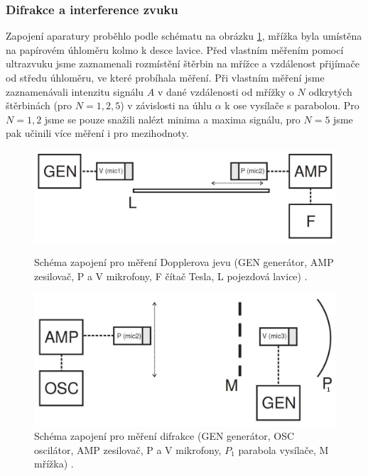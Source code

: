\documentclass[english]{article}
\begin{document}
	\subsubsection{Difrakce a interference zvuku}
		Zapojení aparatury proběhlo podle schématu na obrázku \ref{fig:s_difrakce}, mřížka byla umístěna na papírovém úhloměru kolmo k desce lavice. Před vlastním měřením pomocí ultrazvuku jsme zaznamenali rozmístění štěrbin na mřížce a vzdálenost přijímače od středu úhloměru, ve které probíhala měření. Při vlastním měření jsme zaznamenávali intenzitu signálu $A$ v dané vzdálenosti od mřížky o $N$ odkrytých štěrbinách (pro $N = 1,2,5$) v závislosti na úhlu $\alpha$ k ose vysílače s parabolou. Pro $N=1, 2$ jsme se pouze snažili nalézt minima a maxima signálu, pro $N=5$ jsme pak učinili více měření i pro mezihodnoty.
		
	\begin{figure}
	\begin{minipage}{.45\textwidth}
		\centering
		\includegraphics[width=1\linewidth]{att/s_doppler.jpg}
		\caption{Schéma zapojení pro měření Dopplerova jevu (GEN generátor, AMP zesilovač, P a V mikrofony, F čítač Tesla, L pojezdová lavice) \cite{bib:zadani}.}
		\label{fig:s_doppler}
	\end{minipage}
	\centering
	\hfill
	\begin{minipage}{.45\textwidth}
		\centering
		\includegraphics[width=.73\linewidth]{att/s_difrakce.jpg}
		\caption{Schéma zapojení pro měření difrakce (GEN generátor, OSC oscilátor, AMP zesilovač, P a V mikrofony, $P_1$ parabola vysílače, M mřížka) \cite{bib:zadani}.}
		\label{fig:s_difrakce}
	\end{minipage}%
	
	\end{figure}
\end{document}
